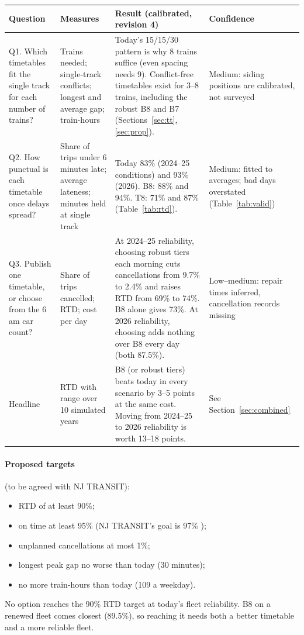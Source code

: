 \documentclass[11pt]{article}
\begin{document}
{\small
\begin{longtable}{@{}p{3.6cm}p{4.1cm}p{5.2cm}p{2.3cm}@{}}
\toprule
Question & Measures & Result (calibrated, revision 4) & Confidence \\ \midrule\endhead
Q1. Which timetables fit the single track for each number of trains? & Trains needed; single-track conflicts; longest and average gap; train-hours & Today's 15/15/30 pattern is why 8 trains suffice (even spacing needs 9). Conflict-free timetables exist for 3--8 trains, including the robust B8 and B7 (Sections~\ref{sec:tt}, \ref{sec:prop}). & Medium: siding positions are calibrated, not surveyed \\
Q2. How punctual is each timetable once delays spread? & Share of trips under 6 minutes late; average lateness; minutes held at single track & Today 83\% (2024--25 conditions) and 93\% (2026). B8: 88\% and 94\%. T8: 71\% and 87\% (Table~\ref{tab:rtd}). & Medium: fitted to averages; bad days overstated (Table~\ref{tab:valid}) \\
Q3. Publish one timetable, or choose from the 6\,am car count? & Share of trips cancelled; RTD; cost per day & At 2024--25 reliability, choosing robust tiers each morning cuts cancellations from 9.7\% to 2.4\% and raises RTD from 69\% to 74\%. B8 alone gives 73\%. At 2026 reliability, choosing adds nothing over B8 every day (both 87.5\%). & Low--medium: repair times inferred, cancellation records missing \\
Headline & RTD with range over 10 simulated years & B8 (or robust tiers) beats today in every scenario by 3--5 points at the same cost. Moving from 2024--25 to 2026 reliability is worth 13--18 points. & See Section~\ref{sec:combined} \\
\bottomrule
\end{longtable}}

\paragraph{Proposed targets} (to be agreed with NJ TRANSIT):
\begin{itemize}
\item RTD of at least 90\%;
\item on time at least 95\% (NJ TRANSIT's goal is 97\% \citep{news12_2025});
\item unplanned cancellations at most 1\%;
\item longest peak gap no worse than today (30 minutes);
\item no more train-hours than today (109 a weekday).
\end{itemize}
No option reaches the 90\% RTD target at today's fleet reliability. B8 on a renewed fleet comes closest (89.5\%), so reaching it needs both a better timetable and a more reliable fleet.
\end{document}

